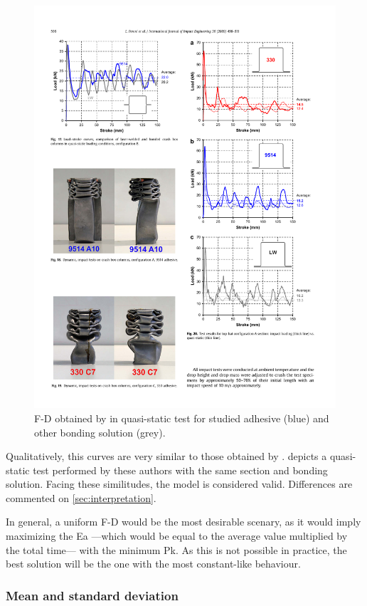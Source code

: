 \documentclass[
documentsize = a4, %
font = cmr, %
typesize = 11, %
printmode = true,
onehalfspacing = true,
language = en, %
titlepage = udciccp, %
degree = pt, %
dedication = true,
acknowledgements = true,
abstract-en = true,
abstract-es = false,
abstract-ga = false,
epigraphs = true,
toc = true,
lof = true,
lot = true,
frontmatterintoc = false,
notation = false,
minimal = false,
]{UDCthesis}
\begin{document}
\begin{figure}
	\centering
	\includegraphics[width=0.7\linewidth]{IMG_CUTRES/peroni_qstat_fd}
	\caption[\Acrlong{F-D} obtained by \citet{Peroni2009} in quasi-static test for studied adhesive and other bonding solution.]{\Acrlong{F-D} obtained by \citet{Peroni2009} in quasi-static test for studied adhesive (blue) and other bonding solution (grey).}
	\label{fig:peroni_qstat_fd}
\end{figure}

Qualitatively, this curves are very similar to those obtained by \citet{Peroni2009}.  depicts a quasi-static test performed by these authors with the same section and bonding solution. Facing these similitudes, the model is considered valid. Differences are commented on \cref{sec:interpretation}.

In general, a uniform \gls{F-D} would be the most desirable scenary, as it would imply maximizing the \gls{Ea} ---which would be equal to the average value multiplied by the total time--- with the minimum \gls{Pk}. As this is not possible in practice, the best solution will be the one with the most constant-like behaviour.

\subsubsection{Mean and standard deviation}
\end{document}
